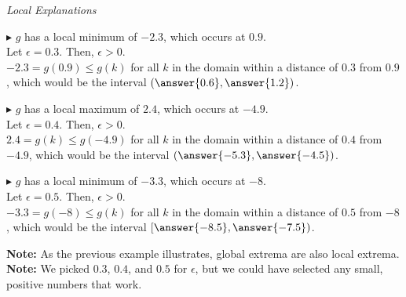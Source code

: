 \documentclass{ximera}
\begin{document}
\begin{explanation} \textit{Local Explanations}




$\blacktriangleright$ $g$ has a local minimum of $-2.3$, which occurs at $0.9$. \\


Let $\epsilon = 0.3$.  Then, $\epsilon > 0$.   \\
$-2.3 = g(0.9) \leq g(k)$ for all $k$ in the domain within a distance of $0.3$ from $0.9$, which would be the interval $\left(\answer{0.6}, \answer{1.2}\right)$.




$\blacktriangleright$ $g$ has a local maximum of $2.4$, which occurs at $-4.9$. \\






Let $\epsilon = 0.4$.  Then, $\epsilon > 0$.  \\
$2.4 = g(k) \leq g(-4.9)$ for all $k$ in the domain within a distance of $0.4$ from $-4.9$, which would be the interval $\left(\answer{-5.3}, \answer{-4.5}\right)$.




$\blacktriangleright$ $g$ has a local minimum of $-3.3$, which occurs at $-8$. \\





Let $\epsilon = 0.5$.  Then, $\epsilon > 0$. \\

$-3.3 = g(-8) \leq g(k)$ for all $k$ in the domain within a distance of $0.5$ from $-8$, which would be the interval $\left[\answer{-8.5}, \answer{-7.5}\right)$.


\end{explanation}


\textbf{Note:} As the previous example illustrates, global extrema are also local extrema. \\
\textbf{Note:} We picked $0.3$, $0.4$, and $0.5$ for $\epsilon$, but we could have selected any small, positive numbers that work.
\end{document}
